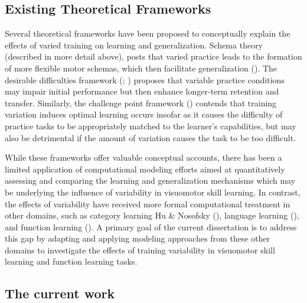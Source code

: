 \documentclass[
  11pt,
  letterpaper,
]{article}
\begin{document}
\subsection{Existing Theoretical
Frameworks}\label{existing-theoretical-frameworks}

Several theoretical frameworks have been proposed to conceptually
explain the effects of varied training on learning and generalization.
Schema theory (described in more detail above), posts that varied
practice leads to the formation of more flexible motor schemas, which
then facilitate generalization
(). The
desirable difficulties framework
(;
) proposes that variable practice conditions may impair
initial performance but then enhance longer-term retention and transfer.
Similarly, the challenge point framework
() contends that training variation induces optimal learning occurs
insofar as it causes the difficulty of practice tasks to be
appropriately matched to the learner's capabilities, but may also be
detrimental if the amount of variation causes the task to be too
difficult.

While these frameworks offer valuable conceptual accounts, there has
been a limited application of computational modeling efforts aimed at
quantitatively assessing and comparing the learning and generalization
mechanisms which may be underlying the influence of variability in
visuomotor skill learning. In contrast, the effects of variability have
received more formal computational treatment in other domains, such as
category learning Hu \& Nosofsky
(), language
learning (), and function learning
(). A
primary goal of the current dissertation is to address this gap by
adapting and applying modeling approaches from these other domains to
investigate the effects of training variability in visuomotor skill
learning and function learning tasks.

\subsection{The current work}\label{the-current-work}
\end{document}
